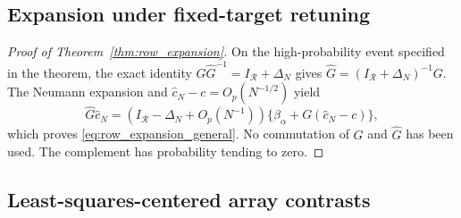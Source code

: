 \documentclass[pdflatex,iicol,sn-mathphys-ay]{sn-jnl}
\theoremstyle{thmstyleone}
\theoremstyle{thmstylethree}
\theoremstyle{thmstyletwo}
\begin{document}
\subsection{Expansion under fixed-target retuning}
\label{app:proof-row-expansion}

\begin{proof}[Proof of Theorem~{\upshape\ref{thm:row_expansion}}]
On the high-probability event specified in the theorem, the exact identity
$G\widehat G^{-1}=I_{\mathcal R}+\Delta_N$ gives
$\widehat G=(I_{\mathcal R}+\Delta_N)^{-1}G$.
The Neumann expansion and
$\widehat c_N-c=O_p(N^{-1/2})$ yield
\[
 \widehat G\widehat c_N
 =(I_{\mathcal R}-\Delta_N+O_p(N^{-1}))
       \{\beta_\alpha+G(\widehat c_N-c)\},
\]
which proves \eqref{eq:row_expansion_general}. No commutation of $G$ and
$\widehat G$ has been used. The complement has probability tending to zero.
\end{proof}

\subsection{Least-squares-centered array contrasts}
\label{app:proof-array-ls}
\end{document}
